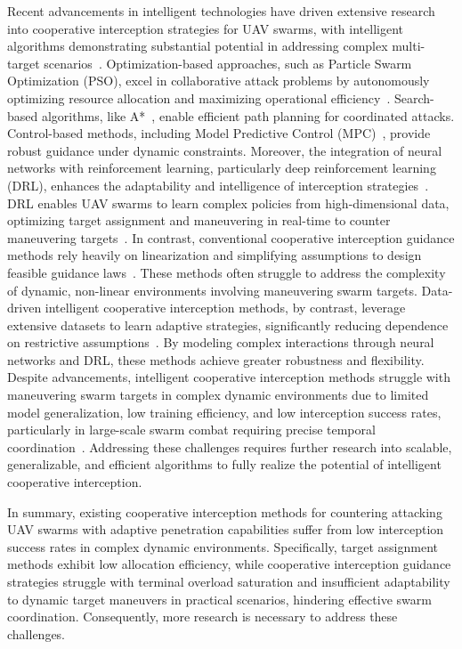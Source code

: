 \documentclass[lettersize,journal]{IEEEtran}
\begin{document}
Recent advancements in intelligent technologies have driven extensive research into cooperative
interception strategies for UAV swarms, with intelligent algorithms demonstrating substantial
potential in addressing complex multi-target scenarios~\cite{chen2024enhanced,wu2020collaborative}.
Optimization-based approaches, such as Particle Swarm Optimization (PSO), excel in
collaborative attack problems by autonomously optimizing resource allocation and maximizing
operational efficiency~\cite{zhao2024hierarchical,wu2020collaborative}.
Search-based algorithms, like A*~\cite{liao2024research}, enable efficient path planning for
coordinated attacks.
Control-based methods, including Model Predictive Control
(MPC)~\cite{kim2024adaptive}, provide robust guidance under dynamic constraints.
Moreover, the integration of neural networks with reinforcement learning, particularly deep
reinforcement learning (DRL), enhances the adaptability and intelligence of interception
strategies~\cite{luo2022uav,zhan2022multiple,wang2021uav}.
DRL enables UAV swarms to learn complex policies from high-dimensional data, optimizing target
assignment and maneuvering in real-time to counter maneuvering targets~\cite{sun2024memory}.
In contrast, conventional cooperative interception guidance methods rely heavily on
linearization and simplifying assumptions to design feasible guidance laws~\cite{zhao2025global}.
These methods often struggle to address the complexity of dynamic, non-linear environments
involving maneuvering swarm targets.
Data-driven intelligent cooperative interception methods, by contrast, leverage extensive
datasets to learn adaptive strategies, significantly reducing dependence on restrictive
assumptions~\cite{fainkich2025cooperative}.
By modeling complex interactions through neural networks and DRL, these methods achieve greater
robustness and flexibility.
Despite advancements, intelligent cooperative interception methods struggle with maneuvering
swarm targets in complex dynamic environments due to limited model generalization, low training
efficiency, and low interception success rates, particularly in large-scale swarm combat
requiring precise temporal coordination~\cite{horyna2023decentralized}.
Addressing these challenges requires further research into scalable, generalizable, and
efficient algorithms to fully realize the potential of intelligent cooperative interception.

In summary, existing cooperative interception methods for countering attacking UAV swarms with
adaptive penetration capabilities suffer from low interception success rates in complex dynamic
environments.
Specifically, target assignment methods exhibit low allocation efficiency, while cooperative
interception guidance strategies struggle with terminal overload saturation and insufficient
adaptability to dynamic target maneuvers in practical scenarios, hindering effective swarm
coordination.
Consequently, more research is necessary to address these challenges.
\end{document}

